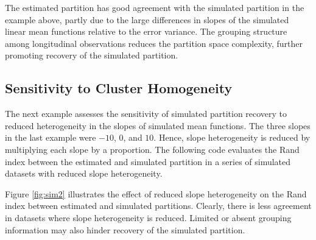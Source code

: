 \documentclass[article, nojss]{jss}
\begin{document}
The estimated partition has good agreement with the simulated partition in the example above, partly due to the large differences in slopes of the simulated linear mean functions relative to the error variance. The grouping structure among longitudinal observations reduces the partition space complexity, further promoting recovery of the simulated partition. 

\subsection[Sensitivity]{Sensitivity to Cluster Homogeneity}

The next example assesses the sensitivity of simulated partition recovery to reduced heterogeneity in the slopes of simulated mean functions. The three slopes in the last example were $-10$, $0$, and $10$. Hence, slope heterogeneity is reduced by multiplying each slope by a proportion. The following  code evaluates the Rand index between the estimated and simulated partition in a series of simulated datasets with reduced slope heterogeneity.

\begin{Schunk}
\end{Schunk}

Figure \ref{fig:sim2} illustrates the effect of reduced slope heterogeneity on the Rand index between estimated and simulated partitions. Clearly, there is less agreement in datasets where slope heterogeneity is reduced. Limited or absent grouping information may also hinder recovery of the simulated partition. 
\end{document}
